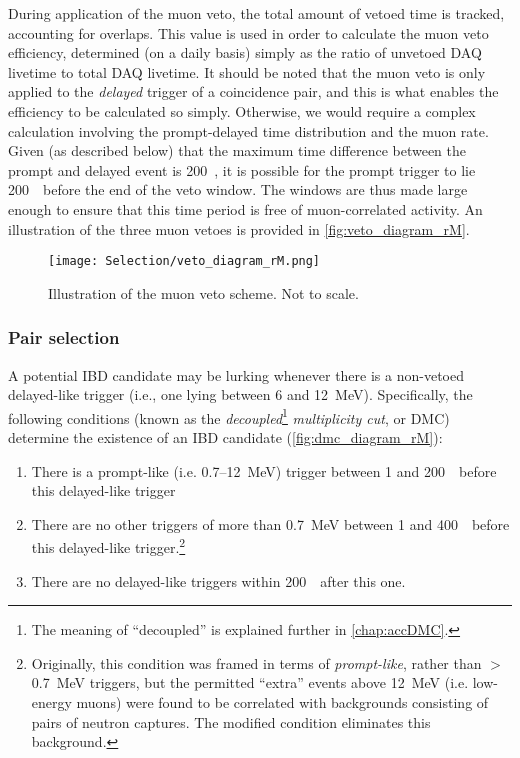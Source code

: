 \documentclass[../thesis.tex]{subfiles}
\begin{document}
During application of the muon veto, the total amount of vetoed time is tracked, accounting for overlaps. This value is used in order to calculate the muon veto efficiency, determined (on a daily basis) simply as the ratio of unvetoed DAQ livetime to total DAQ livetime. It should be noted that the muon veto is only applied to the \emph{delayed} trigger of a coincidence pair, and this is what enables the efficiency to be calculated so simply. Otherwise, we would require a complex calculation involving the prompt-delayed time distribution and the muon rate. Given (as described below) that the maximum time difference between the prompt and delayed event is 200~\us, it is possible for the prompt trigger to lie 200~\us\ before the end of the veto window. The windows are thus made large enough to ensure that this time period is free of muon-correlated activity. An illustration of the three muon vetoes is provided in \autoref{fig:veto_diagram_rM}.

\begin{figure}[h]
  \texttt{[image: Selection/veto\_diagram\_rM.png]}
  \caption{Illustration of the muon veto scheme. Not to scale.}
  \label{fig:veto_diagram_rM}
\end{figure}

\subsubsection{Pair selection}
\label{sec:pairSel}

A potential IBD candidate may be lurking whenever there is a non-vetoed delayed-like trigger (i.e., one lying between 6 and 12~MeV). Specifically, the following conditions (known as the \emph{decoupled}\footnote{The meaning of ``decoupled'' is explained further in \autoref{chap:accDMC}.} \emph{multiplicity cut}, or DMC) determine the existence of an IBD candidate (\autoref{fig:dmc_diagram_rM}):

\begin{enumerate}
\item There is a prompt-like (i.e. 0.7--12~MeV) trigger between 1 and 200~\us\ before this delayed-like trigger
\item There are no other triggers of more than 0.7~MeV between 1 and 400~\us\ before this delayed-like trigger.\footnote{Originally, this condition was framed in terms of \emph{prompt-like}, rather than $>$0.7~MeV triggers, but the permitted ``extra'' events above 12~MeV (i.e. low-energy muons) were found to be correlated with backgrounds consisting of pairs of neutron captures. The modified condition eliminates this background.}
\item There are no delayed-like triggers within 200~\us\ after this one.
\end{enumerate}
\end{document}
